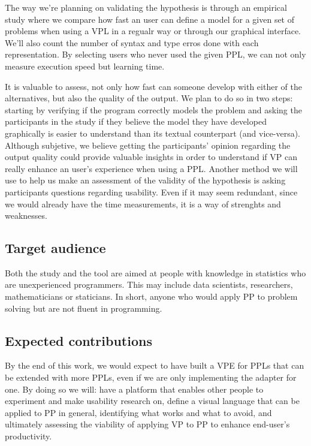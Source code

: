 The way we're planning on validating the hypothesis is through an empirical study
where we compare how fast an user can define a model for a given set of problems
when using a VPL in a regualr way or through our graphical interface. We'll also
count the number of syntax and type erros done with each representation. By
selecting users who never used the given PPL, we can not only measure execution
speed but learning time.

It is valuable to assess, not only how fast can someone develop with either
of the alternatives, but also the quality of the output. We plan to do so in two
steps: starting by verifying if the program correctly models the problem and
asking the participants in the study if they believe the model they
have developed graphically is easier to understand than its textual counterpart (and
vice-versa).
Although subjetive, we believe getting the participants' opinion
regarding the output quality could provide valuable insights in order to understand if VP can
really enhance an user's experience when using a PPL. Another method we will use
to help us make an assessment of the validity of the hypothesis is asking
participants questions regarding usability. Even if it may seem redundant, since
we would already have the time measurements, it is a way of strenghts and
weaknesses.

\subsection{Target audience}

Both the study and the tool are aimed at people with knowledge in statistics
who are unexperienced programmers. This may include data scientists, researchers,
mathematicians or staticians. In short, anyone who would apply PP to problem
solving but are not fluent in programming.

\subsection{Expected contributions}

By the end of this work, we would expect to have built a VPE for PPLs that can
be extended with more PPLs, even if we are only implementing the adapter for one.
By doing so we will: have a platform that enables other people to experiment
and make usability research on, define a visual language that can be applied to PP in general,
identifying what works and what to avoid,
and ultimately assessing the viability of applying VP to PP to enhance end-user's
productivity.

